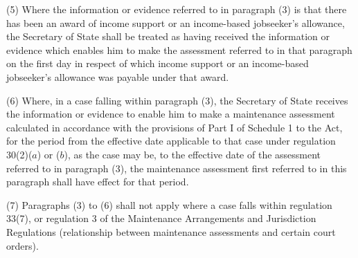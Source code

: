 \documentclass[a4paper,12pt]{article}
\begin{document}
(5) Where the information or evidence referred to in paragraph (3) is that there has been an award of income support or an income-based jobseeker’s allowance, the Secretary of State shall be treated as having received the information or evidence which enables 
him  %
to make the assessment referred to in that paragraph on the first day in respect of which income support or an income-based jobseeker’s allowance was payable under that award.

(6) Where, in a case falling within paragraph (3), 
the Secretary of State  %
receives the information or evidence to enable him to make a maintenance assessment calculated in accordance with the provisions of Part I of Schedule 1 to the Act, for the period from the effective date applicable to that case under regulation 30(2)($a$) or ($b$), as the case may be, to the effective date of the assessment referred to in paragraph (3), the maintenance assessment first referred to in this paragraph shall have effect for that period.

(7) Paragraphs (3) to (6) shall not apply where a case falls within regulation 33(7), or regulation 3 of the Maintenance Arrangements and Jurisdiction Regulations (relationship between maintenance assessments and certain court orders).

\end{document}
